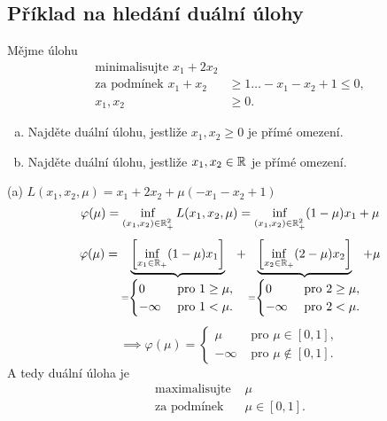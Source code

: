\subsection{Příklad na hledání duální úlohy}
Mějme úlohu
\begin{align*}
    \text{minimalisujte } x_1 + 2x_2 \\
    \text{za podmínek } x_1 + x_2 &\geq 1 \dots -x_1 -x_2 + 1 \leq 0, \\
    x_1, x_2 &\geq 0.
\end{align*}
\begin{enumerate}[(a)]
    \item Najděte duální úlohu, jestliže $x_1, x_2 \geq 0$ je přímé omezení.
    \item Najděte duální úlohu, jestliže $x_1, x_2 \in \mathbb{R}$ je přímé omezení.
\end{enumerate}
(a) $L(x_1, x_2, \mu) = x_1 + 2x_2 + \mu(-x_1 -x_2 + 1)$
\[
    \varphi(\mu) = \inf_{(x_1, x_2) \in \mathbb{R}_+^2} L(x_1, x_2, \mu) = \inf_{(x_1, x_2) \in \mathbb{R}_+^2} (1-\mu)x_1 + \mu
\]
\[
    \varphi(\mu) = \underbrace{\left[\inf_{x_1 \in \mathbb{R}_+} (1-\mu)x_1\right]}_{=
    \begin{cases}
        0 &\text{ pro } 1 \geq \mu, \\
        - \infty &\text{ pro } 1 < \mu.
    \end{cases}} + \underbrace{\left[\inf_{x_2 \in \mathbb{R}_+} (2-\mu)x_2\right]}_{=
    \begin{cases}
        0 &\text{ pro } 2 \geq \mu, \\
        - \infty &\text{ pro } 2 < \mu.
    \end{cases}} + \mu
\]
\[
    \implies \varphi(\mu) =
    \begin{cases}
        \mu &\text{ pro } \mu \in [0,1], \\
        -\infty &\text{ pro } \mu \not\in [0,1].
    \end{cases}
\]
A tedy duální úloha je
\begin{align*}
    \text{maximalisujte }& \mu \\
    \text{za podmínek }& \mu \in [0,1].
\end{align*}


